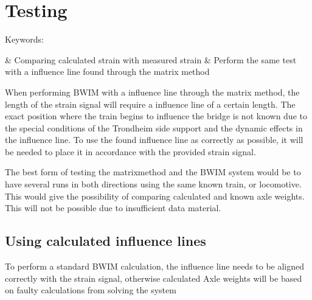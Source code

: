 \section{Testing}
Keywords:

\begin{easylist}[itemize]
& Comparing calculated strain with measured strain
& Perform the same test with a influence line found through the matrix method
\end{easylist}

When performing BWIM with a influence line through the matrix method, the length of the strain signal will require a influence line of a certain length. The exact position where the train begins to influence the bridge is not known due to the special conditions of the Trondheim side support and the dynamic effects in the influence line.
To use the found influence line as correctly as possible, it will be needed to place it in accordance with the provided strain signal.

The best form of testing the matrixmethod and the BWIM system would be to have several runs in both directions using the same known train, or locomotive. This would give the possibility of comparing calculated and known axle weights. This will not be possible due to insufficient data material.


\subsection{Using calculated influence lines}
To perform a standard BWIM calculation, the influence line needs to be aligned correctly with the strain signal, otherwise calculated Axle weights will be based on faulty calculations from solving the system

